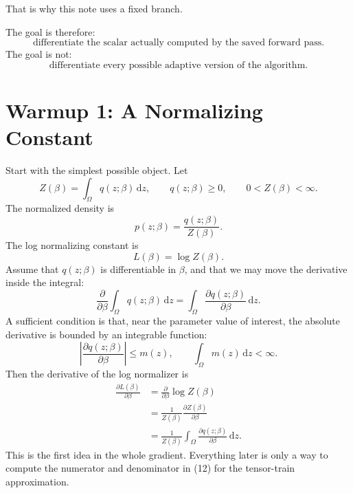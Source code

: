 \documentclass[11pt]{article}
\theoremstyle{remark}
\newcommand{\dd}{\,\mathrm d}
\begin{document}
That is why this note uses a fixed branch.

\begin{center}
\end{center}

The goal is therefore:
\[
    \text{differentiate the scalar actually computed by the saved forward pass.}
    \tag{5}
\]
The goal is not:
\[
    \text{differentiate every possible adaptive version of the algorithm.}
    \tag{6}
\]

\section{Warmup 1: A Normalizing Constant}

Start with the simplest possible object.  Let
\[
    Z(\beta)=\int_\Omega q(z;\beta)\dd z,
    \qquad
    q(z;\beta)\ge 0,
    \qquad
    0<Z(\beta)<\infty.
    \tag{7}
\]
The normalized density is
\[
    p(z;\beta)=\frac{q(z;\beta)}{Z(\beta)}.
    \tag{8}
\]
The log normalizing constant is
\[
    L(\beta)=\log Z(\beta).
    \tag{9}
\]
Assume that \(q(z;\beta)\) is differentiable in \(\beta\), and that we may move
the derivative inside the integral:
\[
    \frac{\partial}{\partial\beta}
    \int_\Omega q(z;\beta)\dd z
    =
    \int_\Omega
    \frac{\partial q(z;\beta)}{\partial\beta}\dd z.
    \tag{10}
\]
A sufficient condition is that, near the parameter value of interest, the
absolute derivative is bounded by an integrable function:
\[
    \left|
    \frac{\partial q(z;\beta)}{\partial\beta}
    \right|
    \le m(z),
    \qquad
    \int_\Omega m(z)\dd z<\infty.
    \tag{11}
\]
Then the derivative of the log normalizer is
\[
\begin{aligned}
    \frac{\partial L(\beta)}{\partial\beta}
    &=
    \frac{\partial}{\partial\beta}\log Z(\beta)\\
    &=
    \frac{1}{Z(\beta)}
    \frac{\partial Z(\beta)}{\partial\beta}\\
    &=
    \frac{1}{Z(\beta)}
    \int_\Omega
    \frac{\partial q(z;\beta)}{\partial\beta}\dd z.
\end{aligned}
\tag{12}
\]
This is the first idea in the whole gradient.  Everything later is only a way
to compute the numerator and denominator in (12) for the tensor-train
approximation.
\end{document}
